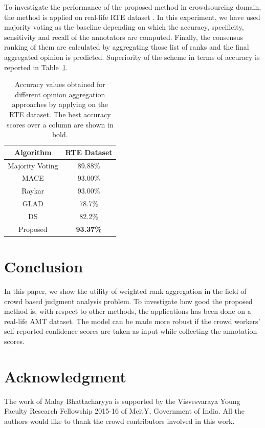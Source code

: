 \documentclass[letterpaper]{article}
\begin{document}
To investigate the performance of the proposed method in crowdsourcing domain, the method is applied on real-life RTE dataset \cite{Sheshadri2013}. In this experiment, we have used majority voting as the baseline depending on which the accuracy, specificity, sensitivity and recall of the annotators are computed. Finally, the consensus ranking of them are calculated by aggregating those list of ranks and the final aggregated opinion is predicted. Superiority of the scheme in terms of accuracy is reported in Table~\ref{table:crowd_aggregation}.

\begin{table}[!t]
\small
\renewcommand{\arraystretch}{1.0}%
\centering
\caption{Accuracy values obtained for different opinion aggregation approaches by applying on the RTE dataset. The best accuracy scores over a column  are shown in bold.}
\begin{tabular}{|c|c|}
\hline
{\bf Algorithm}  & {\bf RTE Dataset} \\\hline
Majority Voting  & 89.88\%       \\\hline
MACE  \cite{Hovy2013}	& 93.00\%   \\\hline
Raykar \cite{Rayker2011} & 93.00\%    \\\hline
GLAD \cite{Whitehill2009} & 78.7\%  \\\hline
DS \cite{Dawid1979} & 82.2\%     \\\hline
Proposed  & {\bf 93.37\%}     \\\hline
\end{tabular}%
\label{table:crowd_aggregation}
\end{table}




\section{Conclusion}
In this paper, we show the utility of weighted rank aggregation in the field of crowd based judgment analysis problem. To investigate how good the proposed method is, with respect to other methods, the applications has been done on a real-life AMT dataset. The model can be made more robust if the crowd workers' self-reported confidence scores are taken as input while collecting the annotation scores.




\section{Acknowledgment}
The work of Malay Bhattacharyya is supported by the Visvesvaraya Young Faculty Research Fellowship 2015-16 of MeitY, Government of India. All the authors would like to thank the crowd contributors involved in this work.






\end{document}
